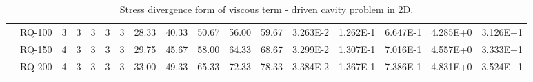 \begin{table}[ht]
\begin{center}
{\begin{tabular}{cc|c|c|c|c|c|c|c|c|c|c|c|c|c|c|c|}
\multicolumn{1}{|c|}{}                      & \multicolumn{1}{|c|}{RQ-100} &	3	&	3	&	3	&	3	&	3	&	28.33	&	40.33	&	50.67	&	56.00	&	59.67	&	3.263E-2	&	1.262E-1	&	6.647E-1	&	4.285E+0	&	3.126E+1	\\
\multicolumn{1}{|c|}{}                      & \multicolumn{1}{|c|}{RQ-150} &	4	&	3	&	3	&	3	&	3	&	29.75	&	45.67	&	58.00	&	64.33	&	68.67	&	3.299E-2	&	1.307E-1	&	7.016E-1	&	4.557E+0	&	3.333E+1	\\
\multicolumn{1}{|c|}{}                      & \multicolumn{1}{|c|}{RQ-200} & 	4	&	3	&	3	&	3	&	3	&	33.00	&	49.33	&	65.33	&	72.33	&	78.33	&	3.384E-2	&	1.367E-1	&	7.386E-1	&	4.831E+0	&	3.524E+1	\\
\cline{1-17}
\end{tabular}
}
\end{center}
\caption{Stress divergence form of viscous term - driven cavity problem in 2D.}
\label{table:stressdrivencavity2d}
\end{table}

